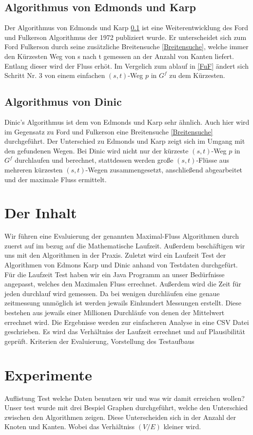 \documentclass[a4paper]{llncs}
\begin{document}
\subsection{Algorithmus von Edmonds und Karp}
\label{EuK}
Der Algorithmus von Edmonds und Karp \ref{EuK} ist eine Weiterentwicklung des Ford und Fulkerson Algorithmus der 1972 publiziert wurde.
Er unterscheidet sich zum Ford Fulkerson durch seine zusätzliche Breitensuche \ref{Breitensuche},
welche immer den Kürzesten Weg von s nach t gemessen an der Anzahl von Kanten liefert. 
Entlang dieser wird der Fluss erhöt.
Im Vergelich zum ablauf in \ref{FuF} ändert sich Schritt Nr. 3 von einem einfachen $(s, t)$-Weg $p$ in $G^{f}$ zu dem Kürzesten.

\subsection{Algorithmus von Dinic}
\label{Dinic}
Dinic's Algorithmus ist dem von Edmonds und Karp sehr ähnlich. Auch hier wird im Gegensatz zu Ford und Fulkerson eine Breitensuche \ref{Breitensuche} durchgeführt. Der Unterschied zu Edmonds und Karp zeigt sich im Umgang mit den gefundenen Wegen. Bei Dinic wird nicht nur der kürzeste $(s, t)$-Weg $p$ in $G^{f}$ durchlaufen und berechnet, stattdessen werden große $(s, t)$-Flüsse aus mehreren kürzesten $(s, t)$-Wegen zusammengesetzt, anschließend abgearbeitet und der maximale Fluss ermittelt.

\section{Der Inhalt}
\label{Inhalt}
Wir führen eine Evaluierung der genannten Maximal-Fluss Algorithmen durch zuerst auf im bezug auf die Mathematische Laufzeit. Außerdem beschäftigen wir uns mit den Algorithmen in der Praxis. Zuletzt wird ein Laufzeit Test der Algorithmen von Edmons Karp und Dinic anhand von Testdaten durchgefürt.
Für die Laufzeit Test haben wir ein Java Programm an unser Bedürfnisse angepasst, welches den Maximalen Fluss errechnet. Außerdem wird die Zeit für jeden durchlauf wird gemessen.
Da bei wenigen durchläufen eine genaue zeitmessung unmöglich ist werden jewails Einhundert Messungen erstellt. Diese bestehen aus jewails einer Millionen Durchläufe von denen der Mittelwert errechnet wird.
Die Ergebnisse werden zur einfacheren Analyse in eine CSV Datei geschrieben.
Es wird das Verhältniss der Laufzeit errechnet und auf Plausibilität geprüft.
Kriterien der Evaluierung, Vorstellung des Testaufbaus
\section{Experimente}
\label{Experimente}
Auflistung Test welche Daten benutzen wir und was wir damit erreichen wollen?
Unser test wurde mit drei Bespiel Graphen durchgeführt, welche den Unterschied zwischen den Algorithmen zeigen. Diese Unterscheiden sich in der Anzahl der Knoten und Kanten.
Wobei das Verhältniss $(V/E)$ kleiner wird.
\end{document}
